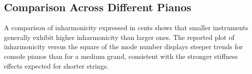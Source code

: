 \subsection{Comparison Across Different Pianos}

A comparison of inharmonicity expressed in cents shows that smaller instruments generally exhibit higher inharmonicity than larger ones. The reported plot of inharmonicity versus the square of the mode number displays steeper trends for console pianos than for a medium grand, consistent with the stronger stiffness effects expected for shorter strings.

